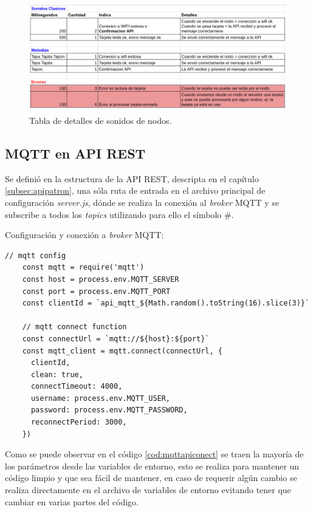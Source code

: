 \begin{figure}[H]
	\centering
	\includegraphics[scale=.40]{./Figures/mqtt-sonidos-nodos.png}
	\caption{Tabla de detalles de sonidos de nodos.}
	\label{fig:mqttsonidosnodos}
\end{figure}



\subsection{MQTT en API REST}
\label{subsec:mqttapi}

Se definió en la estructura de la API REST, descripta en el capítulo \ref{subsec:apipatron}, una sóla ruta de entrada en el archivo principal de configuración \textit{server.js}, dónde se realiza la conexión al \textit{broker} MQTT y se subscribe a todos los \textit{topics} utilizando para ello el símbolo \#. 

Configuración y conexión a \textit{broker} MQTT:
\begin{lstlisting}[label=cod:mqttapiconect,caption= Configuración y conexión a \textit{broker} MQTT en API REST.]
 // mqtt config
    const mqtt = require('mqtt')
    const host = process.env.MQTT_SERVER
    const port = process.env.MQTT_PORT
    const clientId = `api_mqtt_${Math.random().toString(16).slice(3)}`
    
    // mqtt connect function
    const connectUrl = `mqtt://${host}:${port}`
    const mqtt_client = mqtt.connect(connectUrl, {
      clientId,
      clean: true,
      connectTimeout: 4000,
      username: process.env.MQTT_USER,
      password: process.env.MQTT_PASSWORD,
      reconnectPeriod: 3000,
    })
\end{lstlisting}

Como se puede observar en el código \ref{cod:mqttapiconect} se traen la mayoría de los parámetros desde las variables de entorno, esto se realiza para mantener un código limpio y que sea fácil de mantener, en caso de requerir algún cambio se realiza directamente en el archivo de variables de entorno evitando tener que cambiar en varias partes del código.


